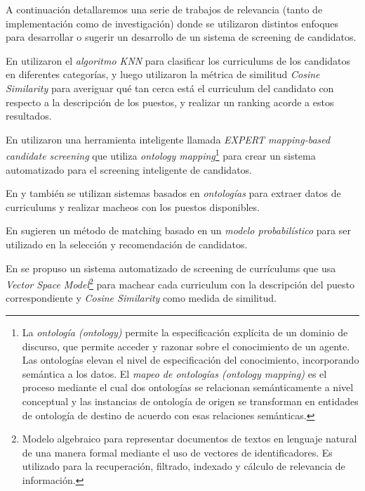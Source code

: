 \documentclass[12pt,a4paper]{article}
\begin{document}
\begin{sloppypar}
A continuación detallaremos una serie de trabajos de relevancia (tanto de implementación como de investigación) donde se utilizaron distintos enfoques para desarrollar o sugerir un desarrollo de un sistema de screening de candidatos.

En \cite{trabajos_relacionados_1} utilizaron el \textit{algoritmo KNN} para clasificar los curriculums de los candidatos en diferentes categorías, y luego utilizaron la métrica de similitud \textit{Cosine Similarity} para averiguar qué tan cerca está el curriculum del candidato con respecto a la descripción de los puestos, y realizar un ranking acorde a estos resultados.

En \cite{trabajos_relacionados_2} utilizaron una herramienta inteligente llamada \textit{EXPERT mapping-based candidate screening} que utiliza \textit{ontology mapping}\footnote{La \textit{ontología (ontology)} permite la especificación explícita de un dominio de discurso, que permite acceder y razonar sobre el conocimiento de un agente. Las ontologías elevan el nivel de especificación del conocimiento, incorporando semántica a los datos.
El \textit{mapeo de ontologías (ontology mapping)} es el proceso mediante el cual dos ontologías se relacionan semánticamente a nivel conceptual y las instancias de ontología de origen se transforman en entidades de ontología de destino de acuerdo con esas relaciones semánticas.\cite{ontology_mapping} } para crear un sistema automatizado para el screening inteligente de candidatos. 

En \cite{trabajos_relacionados_3} y \cite{trabajos_relacionados_4} también se utilizan sistemas basados en \textit{ontologías} para extraer datos de curriculums y realizar macheos con los puestos disponibles.

En \cite{trabajos_relacionados_5} sugieren un método de matching basado en un \textit{modelo probabilístico} para ser utilizado en la selección y recomendación de candidatos. 

En \cite{trabajos_relacionados_6} se propuso un sistema automatizado de screening de currículums que usa \textit{Vector Space Model}\footnote{Modelo algebraico para representar documentos de textos en lenguaje natural de una manera formal mediante el uso de vectores de identificadores. Es utilizado para la recuperación, filtrado, indexado y cálculo de relevancia de información.} para machear cada curriculum con la descripción del puesto correspondiente y \textit{Cosine Similarity} como medida de similitud.

\cleardoublepage    %


\end{sloppypar}
\end{document}
